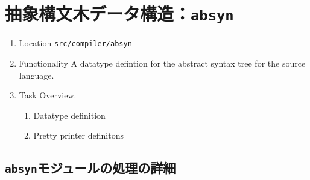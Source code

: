 \documentclass{jbook}
\newif\ifjp
\newcommand{\txt}[2]{#1}
\newcommand{\code}[1]{\mbox{\large\tt #1}}
\begin{document}
\else%
\fi%

% 
\chapter{\txt
{抽象構文木データ構造：\code{absyn}}
{Abstract syntax tree : \code{absyn}}
}
\label{chap:Absyn}

\ifjp%
\begin{enumerate}
\item ソースロケーション \code{src/compiler/absyn}
\item 機能概要 ソース言語の抽象構文木を表現するデータ型
\item 処理概要
\begin{enumerate}
\item 構文木を表すデータ型の定義
\item 構文木プリンタの定義
\end{enumerate}
\item 他モジュールとのインターフェイス
\begin{enumerate}
\item \code{src/compiler/parser2/main/iml.grm} 文法の属性
\item \code{src/compiler/elaborate/main/Elaborator.sml} 構文論的解釈器への入力
\end{enumerate}
\end{enumerate}
\else%
\begin{enumerate}
\item Location
	 \code{src/compiler/absyn}
\item Functionality
	A datatype defintion for the abstract syntax tree for the source
language.
\item Task Overview.
\begin{enumerate}
\item Datatype definition
\item Pretty printer definitons
\end{enumerate}
\end{enumerate}
\fi%

\section{\txt{\code{absyn}モジュールの処理の詳細}{The details of \code{absyn} module}}
\end{document}
